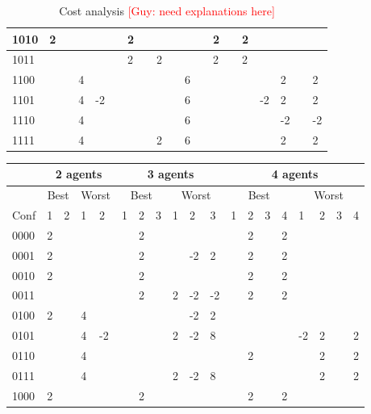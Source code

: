 \documentclass[letterpaper]{article} %
\newcommand{\guy}[1]{{\textcolor{red}{[Guy: #1]}}}
\begin{document}
{\begin{table*}
\begin{tabular}{|l||l|l||l|l||l|l|l||l|l|l||l|l|l|l||l|l|l|l|}
1010	&	2	&		&		&		&			&	2	&		&		&		&		&			&	2	&		&	2	&		&		&		&		\\ \hline
1011	&		&		&		&		&			&	2	&		&	2	&		&		&			&	2	&		&	2	&		&		&		&		\\ \hline
1100	&		&		&	4	&		&			&		&		&		&		&	6	&			&		&		&		&		&	2	&		&	2	\\ \hline
1101	&		&		&	4	&	-2	&			&		&		&		&		&	6	&			&		&		&		&	-2	&	2	&		&	2	\\ \hline
1110	&		&		&	4	&		&			&		&		&		&		&	6	&			&		&		&		&		&	-2	&		&	-2	\\ \hline
1111	&		&		&	4	&		&			&		&		&	2	&		&	6	&			&		&		&		&		&	2	&		&	2	\\ \hline
\end{tabular}
\caption{Cost analysis \guy{need explanations here}}
\label{tbl:costs}
\end{table*}
\begin{table}
\tiny
\begin{tabular}{|l||l|l||l|l||l|l|l||l|l|l||l|l|l|l||l|l|l|l|}
\hline
& \multicolumn{4}{c||}{2 agents}& \multicolumn{6}{c||}{3 agents}& \multicolumn{8}{c|}{4 agents} \\ \hline
	&	\multicolumn{2}{c|}{Best}	&			\multicolumn{2}{c||}{Worst}		&			\multicolumn{3}{c||}{Best}	&					\multicolumn{3}{c||}{Worst}		&					\multicolumn{4}{c||}{Best}			&					\multicolumn{4}{c|}{Worst}	 \\ \hline
Conf	&	1	&	2	&	1	&	2	&		1	&	2	&	3	&	1	&	2	&	3	&		1	&	2	&	3	&	4	&	1	&	2	&	3	&	4	\\ \hline
0000	&	2	&		&		&		&			&	2	&		&		&		&		&			&	2	&		&	2	&		&		&		&		\\ \hline
0001	&	2	&		&		&		&			&	2	&		&		&	-2	&	2	&			&	2	&		&	2	&		&		&		&		\\ \hline
0010	&	2	&		&		&		&			&	2	&		&		&		&		&			&	2	&		&	2	&		&		&		&		\\ \hline
0011	&		&		&		&		&			&	2	&		&	2	&	-2	&	-2	&			&	2	&		&	2	&		&		&		&		\\ \hline
0100	&	2	&		&	4	&		&			&		&		&		&	-2	&	2	&			&		&		&		&	 	&		&		&		\\ \hline
0101	&		&		&	4	&	-2	&			&		&		&	2	&	-2	&	8	&			&		&		&		&	-2	&	2	&		&	2	\\ \hline
0110	&		&		&	4	&		&			&		&		&		&		&		&			&	2	&		&		&		&	2	&		&	2	\\ \hline
0111	&		&		&	4	&		&			&		&		&	2	&	-2	&	8	&			&		&		&		&		&	2	&		&	2	\\ \hline
1000	&	2	&		&		&		&			&	2	&		&		&		&		&			&	2	&		&	2	&		&		&		&		\\ \hline

\end{tabular}
\end{table}}
\end{document}

